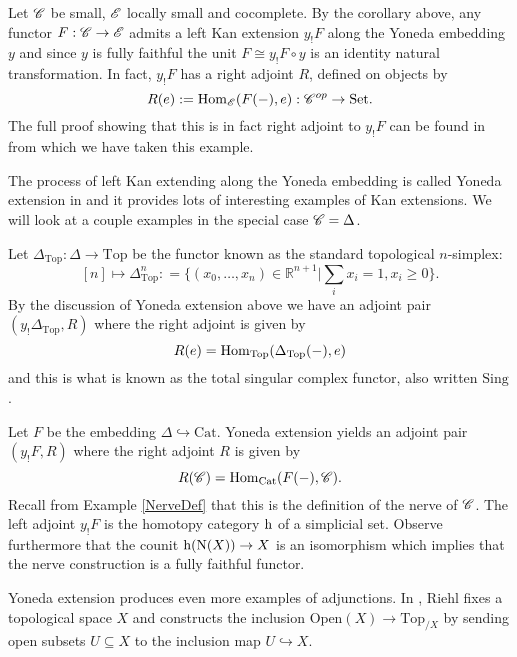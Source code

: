 \documentclass[../../thesis.tex]{subfiles}
\begin{document}
\begin{example}
    Let $\mathscr{C}$ be small, $\mathscr{E}$ locally small and cocomplete.
    By the corollary above, any functor $F: \mathscr{C} \to \mathscr{E}$ admits a left Kan extension $y_!F$ along the Yoneda embedding $y$ and since $y$ is fully faithful the unit $F \cong y_!F\circ y$ is an identity natural transformation.
    In fact, $y_!F$ has a right adjoint $R$, defined on objects by
    \[
        R(e) : = \mathrm{Hom}_{\mathscr{E}}(F({-}), e) : \mathscr{C}^{op} \to \mathrm{Set}.
    \]
    The full proof showing that this is in fact right adjoint to $y_!F$ can be found in \cite[Remark 6.5.9.]{CatContext} from which we have taken this example.
\end{example}
The process of left Kan extending along the Yoneda embedding is called Yoneda extension in \cite[pp.62-64]{CatsSheaves} and it provides lots of interesting examples of Kan extensions.
We will look at a couple examples in the special case $\mathscr{C} = \Delta$.
\begin{example}
    Let $\Delta_{\mathrm{Top}} : \Delta \to \mathrm{Top}$ be the functor known as the standard topological $n$-simplex:
    \[
        [n] \mapsto \Delta^n_{\mathrm{Top}} : = \{(x_0, \dots , x_n) \in \mathbb{R}^{n+1} | \sum_{i}x_i = 1, x_i \geq 0\}  .
    \]
    By the discussion of Yoneda extension above we have an adjoint pair $(y_!\Delta_{\mathrm{Top}}, R)$ where the right adjoint is given by
    \[
        R(e) = \mathrm{Hom}_{\mathrm{Top}}(\Delta_{\mathrm{Top}}({-}), e)
    \]
    and this is what is known as the total singular complex functor, also written $\mathrm{Sing}$.
\end{example}
\begin{example}\label{NerveKan}
    Let $F$ be the embedding $\Delta \hookrightarrow \mathrm{Cat}$.
    Yoneda extension yields an adjoint pair $(y_!F, R)$ where the right adjoint $R$ is given by
    \[
        R(\mathscr{C}) = \mathrm{Hom}_{\mathrm{Cat}}(F({-}), \mathscr{C}).
    \]
    Recall from Example \ref{NerveDef} that this is the definition of the nerve of $\mathscr{C}$.
    The left adjoint $y_!F$ is the homotopy category $\mathrm{h}$ of a simplicial set.
    Observe furthermore that the counit $\mathrm{h}(\mathrm{N}(X)) \to X$ is an isomorphism which implies that the nerve construction is a fully faithful functor.
\end{example}
Yoneda extension produces even more examples of adjunctions.
In \cite[Exercise 6.5.iii.]{CatContext}, Riehl fixes a topological space $X$ and constructs the inclusion $\mathrm{Open}(X) \to \mathrm{Top}_{/X}$ by sending open subsets $U \subseteq X$ to the inclusion map $U\hookrightarrow X$.
\end{document}
